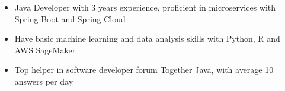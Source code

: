 \begin{itemize}
    \item Java Developer with 3 years experience, proficient in microservices with Spring Boot and Spring Cloud
    \item Have basic machine learning and data analysis skills with Python, R and AWS SageMaker
    \item Top helper in software developer forum Together Java, with average 10 answers per day
\end{itemize}
